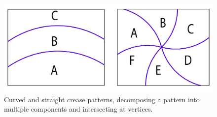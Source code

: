 \begin{figure} [h]
	\centering
	\includegraphics[width=0.7\linewidth]{figures/multiple_crease_patterns}
	\caption{Curved and straight crease patterns, decomposing a pattern into multiple components and intersecting at vertices.}
	\label{fig:multiple_crease_pattern}
\end{figure}
